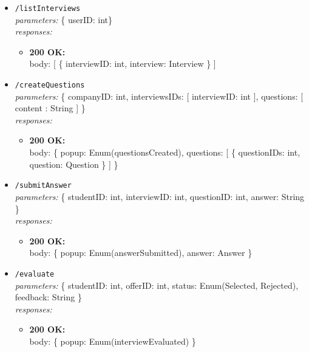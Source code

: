 \begin{itemize}
    \item \texttt{/listInterviews} \\
        \textit{parameters:} \{ userID: int\} \\
        \textit{responses:}
        \begin{itemize}
            \item \textbf{200 OK:} \\
            body: [ \{ interviewID: int, interview: Interview \} ]
        \end{itemize}
    \item \texttt{/createQuestions} \\
        \textit{parameters:} \{ companyID: int, interviewsIDs: [ interviewID: int ], questions: [ content : String ] \} \\
        \textit{responses:}
        \begin{itemize}
            \item \textbf{200 OK:} \\
            body: \{ popup: Enum(questionsCreated), questions: [ \{ questionIDs: int, question: Question \} ] \}
        \end{itemize}
    \item \texttt{/submitAnswer} \\
        \textit{parameters:} \{ studentID: int, interviewID: int, questionID: int,  answer: String \} \\
        \textit{responses:}
        \begin{itemize}
            \item \textbf{200 OK:} \\
            body: \{ popup: Enum(answerSubmitted), answer: Answer \}
        \end{itemize}
    \item \texttt{/evaluate} \\
        \textit{parameters:} \{ studentID: int, offerID: int, status: Enum(Selected, Rejected), feedback: String \} \\
        \textit{responses:}
        \begin{itemize}
            \item \textbf{200 OK:} \\
            body: \{ popup: Enum(interviewEvaluated) \}
        \end{itemize}
\end{itemize}


